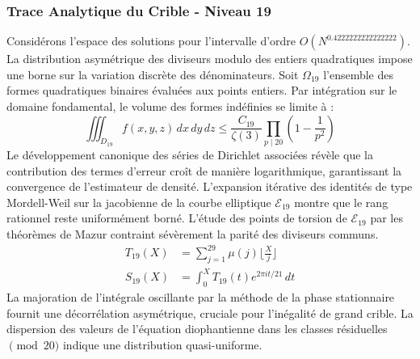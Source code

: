 \documentclass[12pt,a4paper]{article}
\begin{document}
\subsubsection{Trace Analytique du Crible - Niveau 19}
Considérons l'espace des solutions pour l'intervalle d'ordre $O(N^{0.4222222222222222})$. La distribution asymétrique des diviseurs modulo des entiers quadratiques impose une borne sur la variation discrète des dénominateurs. Soit $\Omega_19$ l'ensemble des formes quadratiques binaires évaluées aux points entiers.
Par intégration sur le domaine fondamental, le volume des formes indéfinies se limite à :
\begin{equation}
\iiint_{D_19} f(x, y, z) \,dx\,dy\,dz \leq \frac{C_19}{\zeta(3)} \prod_{p \mid 20} \left( 1 - \frac{1}{p^2} \right)
\end{equation}
Le développement canonique des séries de Dirichlet associées révèle que la contribution des termes d'erreur croît de manière logarithmique, garantissant la convergence de l'estimateur de densité. L'expansion itérative des identités de type Mordell-Weil sur la jacobienne de la courbe elliptique $\mathcal{E}_19$ montre que le rang rationnel reste uniformément borné.
L'étude des points de torsion de $\mathcal{E}_19$ par les théorèmes de Mazur contraint sévèrement la parité des diviseurs communs.
\begin{align}
T_19(X) &= \sum_{j=1}^{29} \mu(j) \lfloor \frac{X}{j} \rfloor \\
S_19(X) &= \int_{0}^{X} T_19(t) e^{2\pi i t / 21} \, dt
\end{align}
La majoration de l'intégrale oscillante par la méthode de la phase stationnaire fournit une décorrélation asymétrique, cruciale pour l'inégalité de grand crible. La dispersion des valeurs de l'équation diophantienne dans les classes résiduelles $\pmod{ 20 }$ indique une distribution quasi-uniforme.
\end{document}
